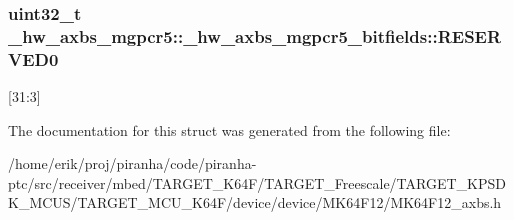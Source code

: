 \subsubsection[{\texorpdfstring{R\+E\+S\+E\+R\+V\+E\+D0}{RESERVED0}}]{\setlength{\rightskip}{0pt plus 5cm}uint32\+\_\+t \+\_\+hw\+\_\+axbs\+\_\+mgpcr5\+::\+\_\+hw\+\_\+axbs\+\_\+mgpcr5\+\_\+bitfields\+::\+R\+E\+S\+E\+R\+V\+E\+D0}\hypertarget{struct__hw__axbs__mgpcr5_1_1__hw__axbs__mgpcr5__bitfields_a2bcc9f5237ebb6020f5ea86b22441e21}{}\label{struct__hw__axbs__mgpcr5_1_1__hw__axbs__mgpcr5__bitfields_a2bcc9f5237ebb6020f5ea86b22441e21}
\mbox{[}31\+:3\mbox{]} 

The documentation for this struct was generated from the following file\+:\begin{DoxyCompactItemize}
\item 
/home/erik/proj/piranha/code/piranha-\/ptc/src/receiver/mbed/\+T\+A\+R\+G\+E\+T\+\_\+\+K64\+F/\+T\+A\+R\+G\+E\+T\+\_\+\+Freescale/\+T\+A\+R\+G\+E\+T\+\_\+\+K\+P\+S\+D\+K\+\_\+\+M\+C\+U\+S/\+T\+A\+R\+G\+E\+T\+\_\+\+M\+C\+U\+\_\+\+K64\+F/device/device/\+M\+K64\+F12/M\+K64\+F12\+\_\+axbs.\+h\end{DoxyCompactItemize}

